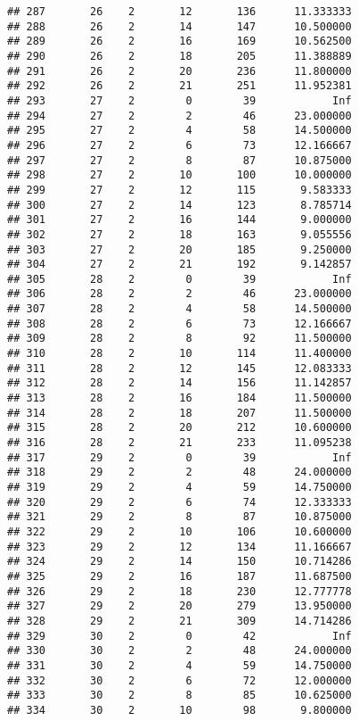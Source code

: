 \documentclass[
]{article}
\begin{document}
\begin{verbatim}
## 287       26    2       12       136      11.333333
## 288       26    2       14       147      10.500000
## 289       26    2       16       169      10.562500
## 290       26    2       18       205      11.388889
## 291       26    2       20       236      11.800000
## 292       26    2       21       251      11.952381
## 293       27    2        0        39            Inf
## 294       27    2        2        46      23.000000
## 295       27    2        4        58      14.500000
## 296       27    2        6        73      12.166667
## 297       27    2        8        87      10.875000
## 298       27    2       10       100      10.000000
## 299       27    2       12       115       9.583333
## 300       27    2       14       123       8.785714
## 301       27    2       16       144       9.000000
## 302       27    2       18       163       9.055556
## 303       27    2       20       185       9.250000
## 304       27    2       21       192       9.142857
## 305       28    2        0        39            Inf
## 306       28    2        2        46      23.000000
## 307       28    2        4        58      14.500000
## 308       28    2        6        73      12.166667
## 309       28    2        8        92      11.500000
## 310       28    2       10       114      11.400000
## 311       28    2       12       145      12.083333
## 312       28    2       14       156      11.142857
## 313       28    2       16       184      11.500000
## 314       28    2       18       207      11.500000
## 315       28    2       20       212      10.600000
## 316       28    2       21       233      11.095238
## 317       29    2        0        39            Inf
## 318       29    2        2        48      24.000000
## 319       29    2        4        59      14.750000
## 320       29    2        6        74      12.333333
## 321       29    2        8        87      10.875000
## 322       29    2       10       106      10.600000
## 323       29    2       12       134      11.166667
## 324       29    2       14       150      10.714286
## 325       29    2       16       187      11.687500
## 326       29    2       18       230      12.777778
## 327       29    2       20       279      13.950000
## 328       29    2       21       309      14.714286
## 329       30    2        0        42            Inf
## 330       30    2        2        48      24.000000
## 331       30    2        4        59      14.750000
## 332       30    2        6        72      12.000000
## 333       30    2        8        85      10.625000
## 334       30    2       10        98       9.800000

\end{verbatim}
\end{document}

